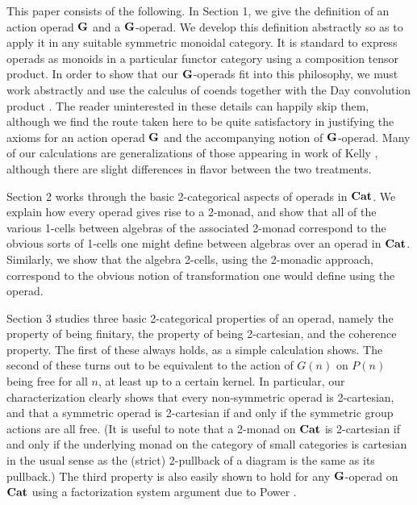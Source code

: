 This paper consists of the following.  In Section 1, we give the definition of an action operad $\mathbf{G}$ and a $\mathbf{G}$-operad.  We develop this definition abstractly so as to apply it in any suitable symmetric monoidal category.   It is standard to express operads as monoids in a particular functor category using a composition tensor product.  In order to show that our $\mathbf{G}$-operads fit into this philosophy, we must work abstractly and use the calculus of coends together with the Day convolution product \cite{day-thesis}.  The reader uninterested in these details can happily skip them, although we find the route taken here to be quite satisfactory in justifying the axioms for an action operad $\mathbf{G}$ and the accompanying notion of $\mathbf{G}$-operad.  Many of our calculations are generalizations of those appearing in work of Kelly \cite{kelly-op}, although there are slight differences in flavor between the two treatments.

Section 2 works through the basic 2-categorical aspects of operads in $\mathbf{Cat}$.  We explain how every operad gives rise to a 2-monad, and show that all of the various 1-cells between algebras of the associated 2-monad correspond to the obvious sorts of 1-cells one might define between algebras over an operad in $\mathbf{Cat}$.  Similarly, we show that the algebra 2-cells, using the 2-monadic approach, correspond to the obvious notion of transformation one would define using the operad.

Section 3 studies three basic 2-categorical properties of an operad, namely the property of being finitary, the property of being 2-cartesian, and the coherence property.  The first of these always holds, as a simple calculation shows.  The second of these turns out to be equivalent to the action of $G(n)$ on $P(n)$ being free for all $n$, at least up to a certain kernel.  In particular, our characterization clearly shows that every non-symmetric operad is 2-cartesian, and that a symmetric operad is 2-cartesian if and only if the symmetric group actions are all free.  (It is useful to note that a 2-monad on $\mathbf{Cat}$ is 2-cartesian if and only if the underlying monad on the category of small categories is cartesian in the usual sense as the (strict) 2-pullback of a diagram is the same as its pullback.)  The third property is also easily shown to hold for any $\mathbf{G}$-operad on $\mathbf{Cat}$ using a factorization system argument due to Power \cite{power-gen}.

